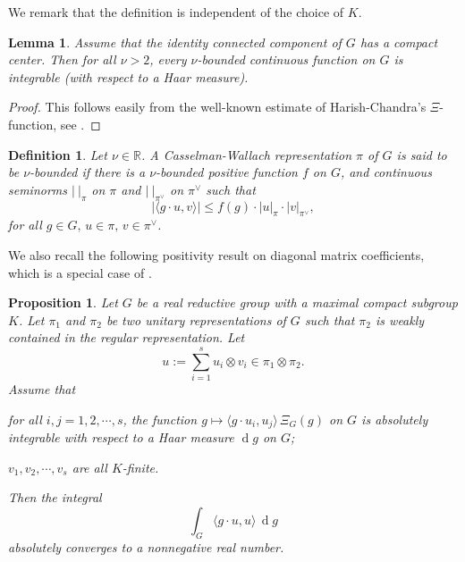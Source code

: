 \documentclass[12pt,a4paper]{amsart}
\def\abs#1{\left|{#1}\right|}
\newcommand{\od}{\operatorname{d}}
\newcommand{\R}{\mathbb R}
\newcommand{\la}{\langle}
\newcommand{\ra}{\rangle}
\numberwithin{equation}{section}
\newtheorem{lem}[thm]{Lemma}
\newtheorem{prpl}[thm]{Proposition}
\newtheorem{dfnl}[thm]{Definition}
\theoremstyle{remark}
\begin{document}
We remark that the definition is independent of the choice of $K$.


\begin{lem}\label{intgrability}
  Assume that the identity connected component of $G$ has a compact center. Then
  for all $\nu>2$, every $\nu$-bounded continuous function on $G$ is integrable
  (with respect to a Haar measure).
\end{lem}

\begin{proof}
  This follows easily from the well-known estimate of Harish-Chandra's
  $\Xi$-function, see \cite[Theorem 4.5.3]{Wa1}.
\end{proof}

\begin{dfnl}
  Let $\nu\in \R$. A Casselman-Wallach representation $\pi$ of $G$ is said to be
  \emph{$\nu$-bounded} if there is a $\nu$-bounded positive function $f$ on $G$,
  and continuous seminorms $\abs{\ }_\pi$ on $\pi$ and $\abs{\ }_{\pi^\vee}$ on
  $\pi^\vee$ such that
  \[
    \abs{\la g\cdot u,v\ra}\leq f(g) \cdot \abs{u}_\pi \cdot \abs{v}_{\pi^\vee},
  \]
  for all $g\in G, \, u\in \pi, \, v\in \pi^\vee$.
\end{dfnl}


We also recall the following positivity result on diagonal matrix coefficients, which is a special case of \cite[Theorem A. 5]{HLS}.

\begin{prpl}\label{positivity}
Let $G$ be a real reductive group with a maximal compact subgroup $K$. Let $\pi_1$ and $\pi_2$ be two unitary representations of $G$ such that $\pi_2$ is weakly
contained in the regular representation.
Let
\[
u:=\sum_{i=1}^s u_i\otimes v_i\in \pi_1\otimes \pi_2.
\]
Assume that
\begin{enumC}
\item for all $i,j=1,2,\cdots, s$, the function
  $g\mapsto \la g \cdot u_i, u_j\ra\,\Xi_G (g)$ on $G$ is absolutely integrable with
  respect to a Haar measure $\od\! g$ on $G$;
\item
  $v_1,v_2,\cdots, v_s$ are all $K$-finite.
\end{enumC}
Then the integral
\[%
\int_G \la g\cdot u,u \rangle\,\od\! g
\]%
absolutely converges to a nonnegative real number.
\end{prpl}
\end{document}
